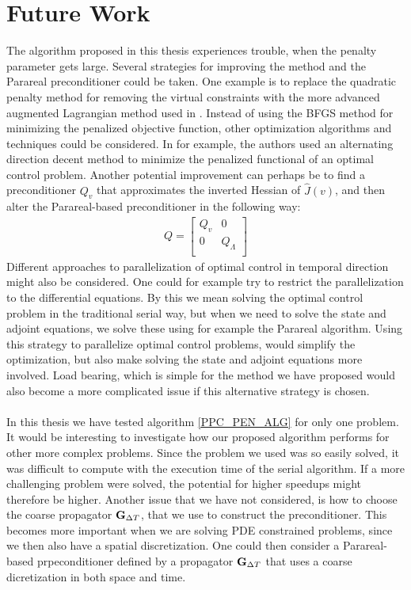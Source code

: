 \section{Future Work}
The algorithm proposed in this thesis experiences trouble, when the penalty parameter gets large. Several strategies for improving the method and the Parareal preconditioner could be taken. One example is to replace the quadratic penalty method for removing the virtual constraints with the more advanced augmented Lagrangian method used in \cite{rao2016time}. Instead of using the BFGS method for minimizing the penalized objective function, other optimization algorithms and techniques could be considered. In \cite{maday2003parallel, maday2007monotonic} for example, the authors used an alternating direction decent method to minimize the penalized functional of an optimal control problem. Another potential improvement can perhaps be to find a preconditioner $Q_v$ that approximates the inverted Hessian of $\hat J(v)$, and then alter the Parareal-based preconditioner in the following way:
\begin{align*}
Q = \left[ \begin{array}{cc}
	Q_v & 0 \\
	0 & Q_{\Lambda} \\
	\end{array} \right]
\end{align*}
Different approaches to parallelization of optimal control in temporal direction might also be considered. One could for example try to restrict the parallelization to the differential equations. By this we mean solving the optimal control problem in the traditional serial way, but when we need to solve the state and adjoint equations, we solve these using for example the Parareal algorithm. Using this strategy to parallelize optimal control problems, would simplify the optimization, but also make solving the state and adjoint equations more involved. Load bearing, which is simple for the method we have proposed would also become a more complicated issue if this alternative strategy is chosen.
\\
\\
In this thesis we have tested algorithm \ref{PPC_PEN_ALG} for only one problem. It would be interesting to investigate how our proposed algorithm performs for other more complex problems. Since the problem we used was so easily solved, it was difficult to compute with the execution time of the serial algorithm. If a more challenging problem were solved, the potential for higher speedups might therefore be higher. Another issue that we have not considered, is how to choose the coarse propagator $\bold G_{\Delta T}$, that we use to construct the preconditioner. This becomes more important when we are solving PDE constrained problems, since we then also have a spatial discretization. One could then consider a Parareal-based prpeconditioner defined by a propagator $\bold G_{\Delta T}$  that uses a coarse dicretization in both space and time.



